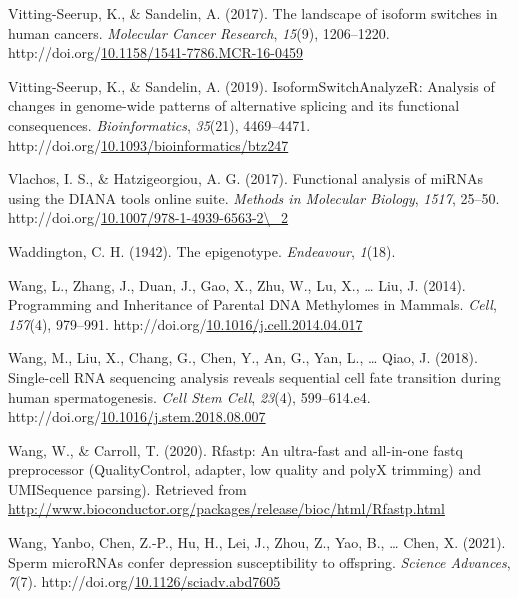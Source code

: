 \documentclass[12pt,twoside]{reedthesis}
\newlength{\cslhangindent}
\newenvironment{CSLReferences}[2] %
 {%
  \setlength{\parindent}{0pt}
  \ifodd #1 \everypar{\setlength{\hangindent}{\cslhangindent}}\ignorespaces\fi
  \ifnum #2 > 0
  \setlength{\parskip}{#2\baselineskip}
  \fi
 }%
 {}
\begin{document}
\begin{CSLReferences}{1}{0}
\leavevmode{}%
Vitting-Seerup, K., \& Sandelin, A. (2017). The landscape of isoform switches in human cancers. \emph{Molecular Cancer Research}, \emph{15}(9), 1206--1220. http://doi.org/\href{https://doi.org/10.1158/1541-7786.MCR-16-0459}{10.1158/1541-7786.MCR-16-0459}

\leavevmode{}%
Vitting-Seerup, K., \& Sandelin, A. (2019). IsoformSwitchAnalyzeR: Analysis of changes in genome-wide patterns of alternative splicing and its functional consequences. \emph{Bioinformatics}, \emph{35}(21), 4469--4471. http://doi.org/\href{https://doi.org/10.1093/bioinformatics/btz247}{10.1093/bioinformatics/btz247}

\leavevmode{}%
Vlachos, I. S., \& Hatzigeorgiou, A. G. (2017). Functional analysis of {miRNAs} using the {DIANA} tools online suite. \emph{Methods in Molecular Biology}, \emph{1517}, 25--50. http://doi.org/\href{https://doi.org/10.1007/978-1-4939-6563-2/_2}{10.1007/978-1-4939-6563-2\textbackslash\_2}

\leavevmode{}%
Waddington, C. H. (1942). The epigenotype. \emph{Endeavour}, \emph{1}(18).

\leavevmode{}%
Wang, L., Zhang, J., Duan, J., Gao, X., Zhu, W., Lu, X., \ldots{} Liu, J. (2014). Programming and Inheritance of Parental DNA Methylomes in Mammals. \emph{Cell}, \emph{157}(4), 979--991. http://doi.org/\href{https://doi.org/10.1016/j.cell.2014.04.017}{10.1016/j.cell.2014.04.017}

\leavevmode{}%
Wang, M., Liu, X., Chang, G., Chen, Y., An, G., Yan, L., \ldots{} Qiao, J. (2018). Single-cell RNA sequencing analysis reveals sequential cell fate transition during human spermatogenesis. \emph{Cell Stem Cell}, \emph{23}(4), 599--614.e4. http://doi.org/\href{https://doi.org/10.1016/j.stem.2018.08.007}{10.1016/j.stem.2018.08.007}

\leavevmode{}%
Wang, W., \& Carroll, T. (2020). Rfastp: An ultra-fast and all-in-one fastq preprocessor (QualityControl, adapter, low quality and polyX trimming) and UMISequence parsing). Retrieved from \url{http://www.bioconductor.org/packages/release/bioc/html/Rfastp.html}

\leavevmode{}%
Wang, Yanbo, Chen, Z.-P., Hu, H., Lei, J., Zhou, Z., Yao, B., \ldots{} Chen, X. (2021). Sperm {microRNAs} confer depression susceptibility to offspring. \emph{Science Advances}, \emph{7}(7). http://doi.org/\href{https://doi.org/10.1126/sciadv.abd7605}{10.1126/sciadv.abd7605}


\end{CSLReferences}
\end{document}
